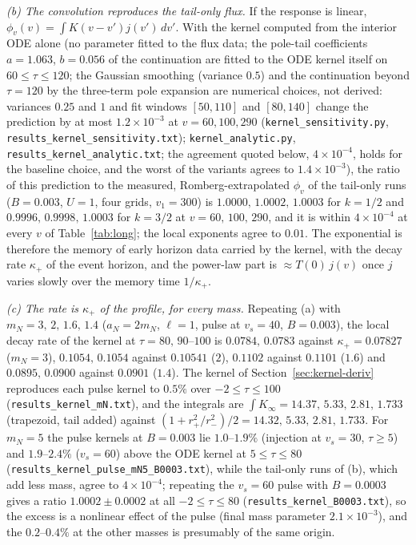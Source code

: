\documentclass[11pt]{article}
\begin{document}
\emph{(b) The convolution reproduces the tail-only flux.} If the response is linear, $\phi_v(v)=\int K(v-v')j(v')\,dv'$. With the kernel computed from the interior ODE alone (no parameter fitted to the flux data; the pole-tail coefficients $a=1.063$, $b=0.056$ of the continuation are fitted to the ODE kernel itself on $60\le\tau\le120$; the Gaussian smoothing (variance $0.5$) and the continuation beyond $\tau=120$ by the three-term pole expansion are numerical choices, not derived: variances $0.25$ and $1$ and fit windows $[50,110]$ and $[80,140]$ change the prediction by at most $1.2\times10^{-3}$ at $v=60,100,290$ (\texttt{kernel\_sensitivity.py}, \texttt{results\_kernel\_sensitivity.txt}); \texttt{kernel\_analytic.py}, \texttt{results\_kernel\_analytic.txt}; the agreement quoted below, $4\times10^{-4}$, holds for the baseline choice, and the worst of the variants agrees to $1.4\times10^{-3}$), the ratio of this prediction to the measured, Romberg-extrapolated $\phi_v$ of the tail-only runs ($B=0.003$, $U=1$, four grids, $v_1=300$) is $1.0000,\,1.0002,\,1.0003$ for $k=1/2$ and $0.9996,\,0.9998,\,1.0003$ for $k=3/2$ at $v=60,\,100,\,290$, and it is within $4\times10^{-4}$ at every $v$ of Table~\ref{tab:long}; the local exponents agree to $0.01$. The exponential is therefore the memory of early horizon data carried by the kernel, with the decay rate $\kappa_+$ of the event horizon, and the power-law part is $\approx T(0)\,j(v)$ once $j$ varies slowly over the memory time $1/\kappa_+$.

\emph{(c) The rate is $\kappa_+$ of the profile, for every mass.} Repeating (a) with $m_N=3,\,2,\,1.6,\,1.4$ ($a_N=2m_N$, $\ell=1$, pulse at $v_s=40$, $B=0.003$), the local decay rate of the kernel at $\tau=80,\,90$--$100$ is $0.0784,\,0.0783$ against $\kappa_+=0.07827$ ($m_N=3$), $0.1054,\,0.1054$ against $0.10541$ ($2$), $0.1102$ against $0.1101$ ($1.6$) and $0.0895,\,0.0900$ against $0.0901$ ($1.4$). The kernel of Section~\ref{sec:kernel-deriv} reproduces each pulse kernel to $0.5\%$ over $-2\le\tau\le100$ (\texttt{results\_kernel\_mN.txt}), and the integrals are $\int K_\infty=14.37,\,5.33,\,2.81,\,1.733$ (trapezoid, tail added) against $(1+r_+^2/r_-^2)/2=14.32,\,5.33,\,2.81,\,1.733$. For $m_N=5$ the pulse kernels at $B=0.003$ lie $1.0$--$1.9\%$ (injection at $v_s=30$, $\tau\ge5$) and $1.9$--$2.4\%$ ($v_s=60$) above the ODE kernel at $5\le\tau\le80$ (\texttt{results\_kernel\_pulse\_mN5\_B0003.txt}), while the tail-only runs of (b), which add less mass, agree to $4\times10^{-4}$; repeating the $v_s=60$ pulse with $B=0.0003$ gives a ratio $1.0002\pm0.0002$ at all $-2\le\tau\le80$ (\texttt{results\_kernel\_B0003.txt}), so the excess is a nonlinear effect of the pulse (final mass parameter $2.1\times10^{-3}$), and the $0.2$--$0.4\%$ at the other masses is presumably of the same origin.
\end{document}
